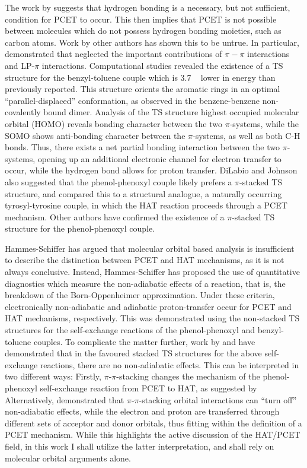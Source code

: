 The work by \citet{Mayer2002} suggests that hydrogen bonding is a necessary, but
not sufficient, condition for PCET to occur. This then implies that PCET is not
possible between molecules which do not possess hydrogen bonding moieties, such
as carbon atoms. Work by other authors has shown this to be
untrue.\cite{Hatcher2007, DiLabio2007} In particular, \citet{DiLabio2007}
demonstrated that \citet{Mayer2002} neglected the important contributions of
$\pi-\pi$ interactions and LP-$\pi$ interactions. Computational studies revealed
the existence of a TS structure for the benzyl-toluene couple which is 3.7
\kcalmol~ lower in energy than previously reported. This structure orients the
aromatic rings in an optimal ``parallel-displaced'' conformation, as observed in
the benzene-benzene non-covalently bound dimer.\cite{Sinnokrot2002} Analysis of
the TS structure highest occupied molecular orbital (HOMO) reveals bonding
character between the two $\pi$-systems, while the SOMO shows anti-bonding
character between the $\pi$-systems, as well as both C-H bonds. Thus, there
exists a net partial bonding interaction between the two $\pi$-systems, opening
up an additional electronic channel for electron transfer to occur, while the
hydrogen bond allows for proton transfer. DiLabio and Johnson also suggested
that the phenol-phenoxyl couple likely prefers a $\pi$-stacked TS structure, and
compared this to a structural analogue, a naturally occurring tyrosyl-tyrosine
couple, in which the HAT reaction proceeds through a PCET mechanism. Other
authors have confirmed the existence of a $\pi$-stacked TS structure for the
phenol-phenoxyl couple.\cite{Sirjoosingh2011, HammesSchiffer2015,
MunozRugeles2017}

Hammes-Schiffer has argued that molecular orbital based analysis is insufficient
to describe the distinction between PCET and HAT mechanisms, as it is not always
conclusive.\cite{Skone2006, HammesSchiffer2015} Instead, Hammes-Schiffer has
proposed the use of quantitative diagnostics which measure the non-adiabatic
effects of a reaction, that is, the breakdown of the Born-Oppenheimer
approximation.\cite{Sirjoosingh2011, HammesSchiffer2015} Under these criteria,
electronically non-adiabatic and adiabatic proton-transfer occur for PCET and
HAT mechanisms, respectively. This was demonstrated using the non-stacked TS
structures for the self-exchange reactions of the phenol-phenoxyl and
benzyl-toluene couples. To complicate the matter further, work by
\citet{Inagaki2011} and \citet{MunozRugeles2017} have demonstrated that in the
favoured stacked TS structures for the above self-exchange reactions, there are
no non-adiabatic effects. This can be interpreted in two different ways:
Firstly, $\pi$-$\pi$-stacking changes the mechanism of the phenol-phenoxyl
self-exchange reaction from PCET to HAT, as suggested by \citet{Inagaki2011}
Alternatively, \citet{MunozRugeles2017} demonstrated that $\pi$-$\pi$-stacking
orbital interactions can ``turn off'' non-adiabatic effects, while the electron
and proton are transferred through different sets of acceptor and donor
orbitals, thus fitting within the definition of a PCET mechanism. While this
highlights the active discussion of the HAT/PCET field, in this work I shall
utilize the latter interpretation, and shall rely on molecular orbital arguments
alone.

